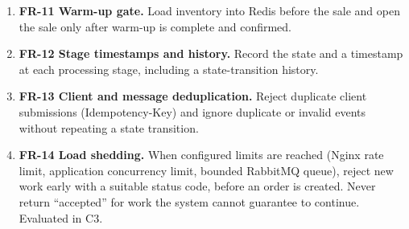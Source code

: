 \documentclass[a4paper]{report}
\begin{document}
\begin{enumerate}
    non-terminal state too long. It is a safety net, not a replacement for the
    Outbox, retry or DLQ.
  \item \textbf{FR-11 Warm-up gate.} Load inventory into Redis before the sale
    and open the sale only after warm-up is complete and confirmed.
  \item \textbf{FR-12 Stage timestamps and history.} Record the state and a
    timestamp at each processing stage, including a state-transition history.
  \item \textbf{FR-13 Client and message deduplication.} Reject duplicate
    client submissions (Idempotency-Key) and ignore duplicate or invalid
    events without repeating a state transition.
  \item \textbf{FR-14 Load shedding.} When configured limits are reached
    (Nginx rate limit, application concurrency limit, bounded RabbitMQ queue),
    reject new work early with a suitable status code, before an order is
    created. Never return ``accepted'' for work the system cannot guarantee to
    continue. Evaluated in C3.
\end{enumerate}
\end{document}
